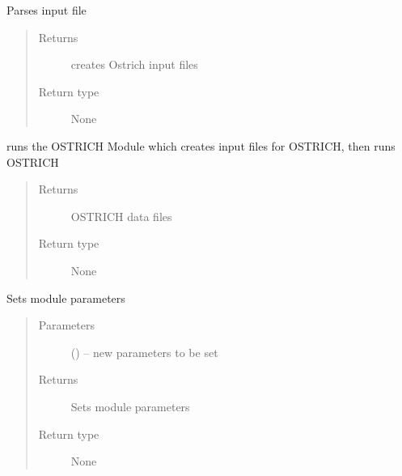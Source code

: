 \documentclass[letterpaper,10pt,english]{sphinxmanual}
\begin{document}
\begin{fulllineitems}
\begin{fulllineitems}
\label{\detokenize{MouseReferenceManual:Modules.Module_OSTRICH.Module_OSTRICH.parseInput}}
Parses input file
\begin{quote}\begin{description}
\item[{Returns}] \leavevmode
creates Ostrich input files

\item[{Return type}] \leavevmode
None

\end{description}\end{quote}

\end{fulllineitems}


\begin{fulllineitems}
\label{\detokenize{MouseReferenceManual:Modules.Module_OSTRICH.Module_OSTRICH.run}}
runs the OSTRICH Module which creates input files for OSTRICH, then runs OSTRICH
\begin{quote}\begin{description}
\item[{Returns}] \leavevmode
OSTRICH data files

\item[{Return type}] \leavevmode
None

\end{description}\end{quote}

\end{fulllineitems}


\begin{fulllineitems}
\label{\detokenize{MouseReferenceManual:Modules.Module_OSTRICH.Module_OSTRICH.setParameters}}
Sets module parameters
\begin{quote}\begin{description}
\item[{Parameters}] \leavevmode
{} () -- new parameters to be set

\item[{Returns}] \leavevmode
Sets module parameters

\item[{Return type}] \leavevmode
None

\end{description}\end{quote}

\end{fulllineitems}


\end{fulllineitems}
\end{document}

